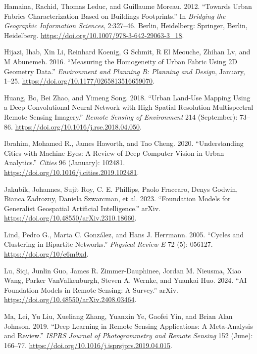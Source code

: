 \documentclass[
  letterpaper,
  DIV=11,
  numbers=noendperiod]{scrartcl}
\newlength{\cslhangindent}
\newenvironment{CSLReferences}[2] %
 {\begin{list}{}{%
  \setlength{\itemindent}{0pt}
  \setlength{\leftmargin}{0pt}
  \setlength{\parsep}{0pt}
  \ifodd #1
   \setlength{\leftmargin}{\cslhangindent}
   \setlength{\itemindent}{-1\cslhangindent}
  \fi
  \setlength{\itemsep}{#2\baselineskip}}}
 {\end{list}}
\begin{document}
\begin{CSLReferences}{1}{0}
Hamaina, Rachid, Thomas Leduc, and Guillaume Moreau. 2012. {``Towards
{Urban Fabrics Characterization Based} on {Buildings Footprints}.''} In
\emph{Bridging the {Geographic Information Sciences}}, 2:327--46.
{Berlin, Heidelberg}: {Springer, Berlin, Heidelberg}.
\url{https://doi.org/10.1007/978-3-642-29063-3_18}.

Hijazi, Ihab, Xin Li, Reinhard Koenig, G Schmit, R El Meouche, Zhihan
Lv, and M Abunemeh. 2016. {``Measuring the Homogeneity of Urban Fabric
Using {2D} Geometry Data.''} \emph{Environment and Planning B: Planning
and Design}, January, 1--25.
\url{https://doi.org/10.1177/0265813516659070}.

Huang, Bo, Bei Zhao, and Yimeng Song. 2018. {``Urban Land-Use Mapping
Using a Deep Convolutional Neural Network with High Spatial Resolution
Multispectral Remote Sensing Imagery.''} \emph{Remote Sensing of
Environment} 214 (September): 73--86.
\url{https://doi.org/10.1016/j.rse.2018.04.050}.

Ibrahim, Mohamed R., James Haworth, and Tao Cheng. 2020.
{``Understanding Cities with Machine Eyes: {A} Review of Deep Computer
Vision in Urban Analytics.''} \emph{Cities} 96 (January): 102481.
\url{https://doi.org/10.1016/j.cities.2019.102481}.

Jakubik, Johannes, Sujit Roy, C. E. Phillips, Paolo Fraccaro, Denys
Godwin, Bianca Zadrozny, Daniela Szwarcman, et al. 2023. {``Foundation
{Models} for {Generalist} {Geospatial} {Artificial} {Intelligence}.''}
arXiv. \url{https://doi.org/10.48550/arXiv.2310.18660}.

Lind, Pedro G., Marta C. González, and Hans J. Herrmann. 2005. {``Cycles
and Clustering in Bipartite Networks.''} \emph{Physical Review E} 72
(5): 056127. \url{https://doi.org/10/c6m9xd}.

Lu, Siqi, Junlin Guo, James R. Zimmer-Dauphinee, Jordan M. Nieusma, Xiao
Wang, Parker VanValkenburgh, Steven A. Wernke, and Yuankai Huo. 2024.
{``{AI} {Foundation} {Models} in {Remote} {Sensing}: {A} {Survey}.''}
arXiv. \url{https://doi.org/10.48550/arXiv.2408.03464}.

Ma, Lei, Yu Liu, Xueliang Zhang, Yuanxin Ye, Gaofei Yin, and Brian Alan
Johnson. 2019. {``Deep Learning in Remote Sensing Applications: {A}
Meta-Analysis and Review.''} \emph{ISPRS Journal of Photogrammetry and
Remote Sensing} 152 (June): 166--77.
\url{https://doi.org/10.1016/j.isprsjprs.2019.04.015}.


\end{CSLReferences}
\end{document}

